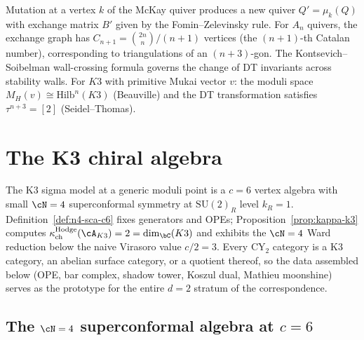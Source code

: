 \begin{remark}
\label{rem:cluster-bridgeland}
Mutation at a vertex $k$ of the McKay quiver produces a new
quiver $Q' = \mu_k(Q)$ with exchange matrix $B'$ given by the
Fomin--Zelevinsky rule. For $A_n$ quivers, the exchange graph
has $C_{n+1} = \binom{2n}{n}/(n+1)$ vertices (the $(n+1)$-th
Catalan number), corresponding to triangulations of an
$(n+3)$-gon. The Kontsevich--Soibelman wall-crossing formula
governs the change of DT invariants across stability walls.
For $K3$ with primitive Mukai vector $v$: the moduli space
$M_H(v) \cong \mathrm{Hilb}^n(K3)$ (Beauville) and the
DT transformation satisfies $\tau^{n+3} = [2]$
(Seidel--Thomas).
\end{remark}



\section{The K3 chiral algebra}
\label{sec:k3-chiral-algebra}

The K3 sigma model at a generic moduli point is a $c=6$ vertex algebra with small $\cN=4$ superconformal symmetry at $\mathrm{SU}(2)_R$ level $k_R=1$. Definition~\ref{def:n4-sca-c6} fixes generators and OPEs; Proposition~\ref{prop:kappa-k3} computes $\kappa_{\mathrm{ch}}^{\mathrm{Hodge}}(\cA_{K3}) = 2 = \dim_\bC(K3)$ and exhibits the $\cN=4$ Ward reduction below the naive Virasoro value $c/2 = 3$. Every $\mathrm{CY}_2$ category is a K3 category, an abelian surface category, or a quotient thereof, so the data assembled below (OPE, bar complex, shadow tower, Koszul dual, Mathieu moonshine) serves as the prototype for the entire $d=2$ stratum of the correspondence.

\subsection{The \texorpdfstring{$\cN = 4$}{cN = 4} superconformal algebra at \texorpdfstring{$c = 6$}{c = 6}}
\label{subsec:n4-sca}

